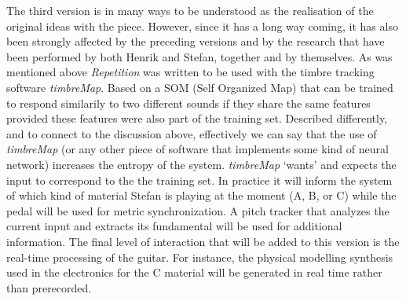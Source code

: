 The third version is in many ways to be understood as the realisation
of the original ideas with the piece. However, since it has a long way
coming, it has also been strongly affected by the preceding
versions and by the research that have been performed by both Henrik
and Stefan, together and by themselves. As was mentioned above
\emph{Repetition} was written to be used with the timbre tracking
software \emph{timbreMap}. Based on a SOM (Self Organized Map) that
can be trained to respond similarily to two different sounds if they
share the same features provided these features were also part of the
training set. Described differently, and to connect to the
discussion above, effectively we can say that the use of
\emph{timbreMap} (or any other piece of software that implements some
kind of neural network) increases the entropy of the
system. \emph{timbreMap} `wants' and expects the input to correspond to the
the training set. In practice it will inform the system of which kind
of material Stefan is playing at the moment (A, B, or C) while the
pedal will be used for metric synchronization. A pitch
tracker that analyzes the current input and extracts its fundamental
will be used for additional information. The final level of
interaction that will be added to this version is the real-time
processing of the guitar. For instance, the physical modelling
synthesis used in the electronics for the C material will be generated
in real time rather than prerecorded.


